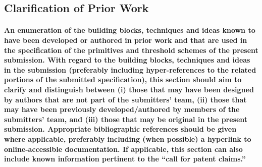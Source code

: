 \begin{description}
\end{description}

\subsection{Clarification of Prior Work}

\paragraph{An enumeration of the building blocks, techniques and ideas known to have been developed or authored in prior work and that are used in the specification of the primitives and threshold schemes of the present submission. With regard to the building blocks, techniques and ideas in the submission (preferably including hyper-references to the related portions of the submitted specification), this section should aim to clarify and distinguish between (i) those that may have been designed by authors that are not part of the submitters’ team, (ii) those that may have been previously developed/authored by members of the submitters’ team, and (iii) those that may be original in the present submission. Appropriate bibliographic references should be given where applicable, preferably including (when possible) a hyperlink to online-accessible documentation. If applicable, this section can also include known information pertinent to the “call for patent claims.”}
%
%
%
%
$\text{ }$

